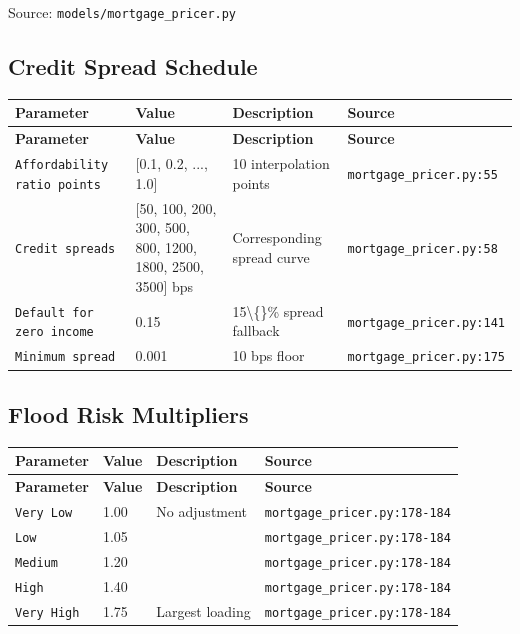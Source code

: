 \documentclass[11pt,a4paper]{article}
\begin{document}
Source: \texttt{models/mortgage\_pricer.py}

\subsection{Credit Spread Schedule}

\begin{longtable}{p{4cm}p{4cm}p{5.5cm}p{3.5cm}}
    \toprule
    \textbf{Parameter} & \textbf{Value} & \textbf{Description} & \textbf{Source} \\
    \midrule
    \endfirsthead
    \toprule
    \textbf{Parameter} & \textbf{Value} & \textbf{Description} & \textbf{Source} \\
    \midrule
    \endhead
    \bottomrule
    \endfoot
    \texttt{Affordability ratio points} & [0.1, 0.2, ..., 1.0] & 10 interpolation points & {\scriptsize \texttt{mortgage\_pricer.py:55}} \\
    \texttt{Credit spreads} & [50, 100, 200, 300, 500, 800, 1200, 1800, 2500, 3500] bps & Corresponding spread curve & {\scriptsize \texttt{mortgage\_pricer.py:58}} \\
    \texttt{Default for zero income} & 0.15 & 15\textbackslash\{\}\% spread fallback & {\scriptsize \texttt{mortgage\_pricer.py:141}} \\
    \texttt{Minimum spread} & 0.001 & 10 bps floor & {\scriptsize \texttt{mortgage\_pricer.py:175}} \\
\end{longtable}

\subsection{Flood Risk Multipliers}

\begin{longtable}{p{4cm}p{4cm}p{5.5cm}p{3.5cm}}
    \toprule
    \textbf{Parameter} & \textbf{Value} & \textbf{Description} & \textbf{Source} \\
    \midrule
    \endfirsthead
    \toprule
    \textbf{Parameter} & \textbf{Value} & \textbf{Description} & \textbf{Source} \\
    \midrule
    \endhead
    \bottomrule
    \endfoot
    \texttt{Very Low} & 1.00 & No adjustment & {\scriptsize \texttt{mortgage\_pricer.py:178-184}} \\
    \texttt{Low} & 1.05 &  & {\scriptsize \texttt{mortgage\_pricer.py:178-184}} \\
    \texttt{Medium} & 1.20 &  & {\scriptsize \texttt{mortgage\_pricer.py:178-184}} \\
    \texttt{High} & 1.40 &  & {\scriptsize \texttt{mortgage\_pricer.py:178-184}} \\
    \texttt{Very High} & 1.75 & Largest loading & {\scriptsize \texttt{mortgage\_pricer.py:178-184}} \\
\end{longtable}
\end{document}
